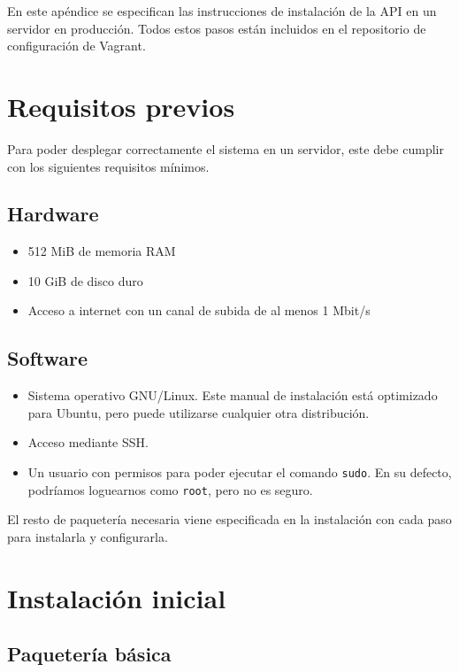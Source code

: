 
En este apéndice se especifican las instrucciones de instalación de la API en
un servidor en producción. Todos estos pasos están incluidos en el repositorio
de configuración de Vagrant.\cite{repo-vagrant}

\section{Requisitos previos}

Para poder desplegar correctamente el sistema en un servidor, este debe cumplir
con los siguientes requisitos mínimos.

\subsection{Hardware}

\begin{itemize}
\item 512 MiB de memoria RAM
\item 10 GiB de disco duro
\item Acceso a internet con un canal de subida de al menos 1 Mbit/s
\end{itemize}

\subsection{Software}

\begin{itemize}
\item Sistema operativo GNU/Linux. Este manual de instalación está optimizado
  para Ubuntu, pero puede utilizarse cualquier otra distribución.
\item Acceso mediante SSH.
\item Un usuario con permisos para poder ejecutar el comando \texttt{sudo}. En su
  defecto, podríamos loguearnos como \texttt{root}, pero no es seguro.
\end{itemize}

El resto de paquetería necesaria viene especificada en la instalación con cada
paso para instalarla y configurarla.


\section{Instalación inicial}

\subsection{Paquetería básica}

